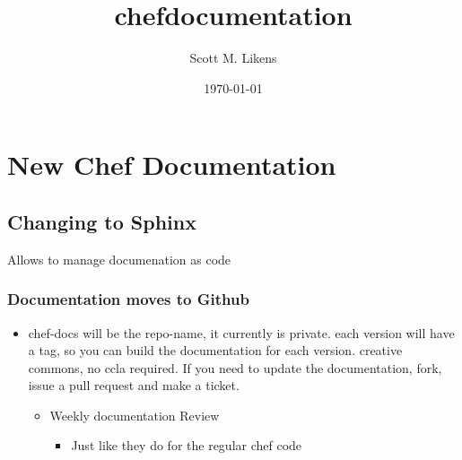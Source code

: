 \documentclass[11pt]{article}
\title{chefdocumentation}
\author{Scott M. Likens}
\date{\today}
\begin{document}
\maketitle

\setcounter{tocdepth}{3}
\tableofcontents
\vspace*{1cm}
\section{New Chef Documentation}
\label{sec-1}
\subsection{Changing to Sphinx}
\label{sec-1-1}

Allows to manage documenation as code
\subsubsection{Documentation moves to Github}
\label{sec-1-1-1}

\begin{itemize}
\item chef-docs will be the repo-name, it currently is private.
  each version will have a tag, so you can build the documentation for each version.
  creative commons, no ccla required.  
  If you need to update the documentation, fork, issue a pull request and make a ticket.
\begin{itemize}
\item Weekly documentation Review
\begin{itemize}
\item Just like they do for the regular chef code
\end{itemize}
\end{itemize}
\end{itemize}
\end{document}
